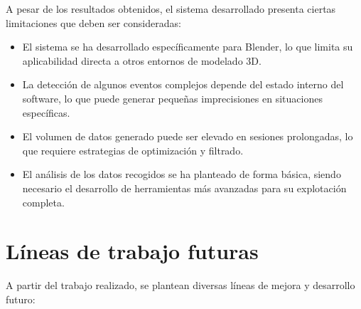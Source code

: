 A pesar de los resultados obtenidos, el sistema desarrollado presenta ciertas limitaciones que deben ser consideradas:

\begin{itemize}

    \item El sistema se ha desarrollado específicamente para Blender, lo que limita su aplicabilidad directa a otros entornos de modelado 3D.

    \item La detección de algunos eventos complejos depende del estado interno del software, lo que puede generar pequeñas imprecisiones en situaciones específicas.

    \item El volumen de datos generado puede ser elevado en sesiones prolongadas, lo que requiere estrategias de optimización y filtrado.

    \item El análisis de los datos recogidos se ha planteado de forma básica, siendo necesario el desarrollo de herramientas más avanzadas para su explotación completa.

\end{itemize}

\section{Líneas de trabajo futuras}

A partir del trabajo realizado, se plantean diversas líneas de mejora y desarrollo futuro:

